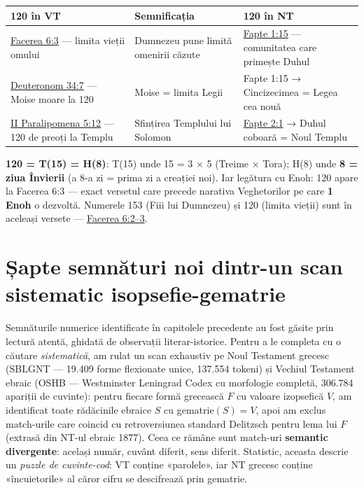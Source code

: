 \documentclass[12pt,a4paper,twoside,openany]{book}
\begin{document}
\begin{center}
\small
\begin{tabular}{L{5.4cm}L{4.3cm}L{5.2cm}}
\toprule
{}
\textbf{120 în VT} & \textbf{Semnificația} & \textbf{120 în NT} \\
\midrule
\href{https://bibliaortodoxa.ro/carte.php?id=25\&cap=6\#3}{Facerea 6:3} — limita vieții omului & Dumnezeu pune limită omenirii căzute & \href{https://bibliaortodoxa.ro/carte.php?id=26\&cap=1\#15}{Fapte 1:15} — comunitatea care primește Duhul \\
\href{https://bibliaortodoxa.ro/carte.php?id=17\&cap=34\#7}{Deuteronom 34:7} — Moise moare la 120 & Moise = limita Legii & Fapte 1:15 → Cincizecimea = Legea cea nouă \\
\href{https://bibliaortodoxa.ro/carte.php?id=15\&cap=5\#12}{II Paralipomena 5:12} — 120 de preoți la Templu & Sfințirea Templului lui Solomon & \href{https://bibliaortodoxa.ro/carte.php?id=26\&cap=2\#1}{Fapte 2:1} → Duhul coboară = Noul Templu \\
\bottomrule
\end{tabular}
\end{center}
\normalsize
\textbf{120 = T(15) = H(8)}: T(15) unde 15 = 3 × 5 (Treime × Tora); H(8) unde \textbf{8 = ziua Învierii} (a 8-a zi = prima zi a creației noi). Iar legătura cu Enoh: 120 apare la Facerea 6:3 — exact versetul care precede narativa Veghetorilor pe care \textbf{1 Enoh} o dezvoltă. Numerele 153 (Fiii lui Dumnezeu) și 120 (limita vieții) sunt în aceleași versete — \href{https://bibliaortodoxa.ro/carte.php?id=25\&cap=6\#2}{Facerea 6:2–3}.


\section{Șapte semnături noi dintr-un scan sistematic isopsefie-gematrie}
\label{sec:cipher_scan_ro}

Semnăturile numerice identificate în capitolele precedente au fost găsite prin lectură atentă, ghidată de observații literar-istorice. Pentru a le completa cu o căutare \textit{sistematică}, am rulat un scan exhaustiv pe Noul Testament grecesc (SBLGNT — 19.409 forme flexionate unice, 137.554 tokeni) și Vechiul Testament ebraic (OSHB — Westminster Leningrad Codex cu morfologie completă, 306.784 apariții de cuvinte): pentru fiecare formă grecească $F$ cu valoare izopsefică $V$, am identificat toate rădăcinile ebraice $S$ cu gematrie$(S) = V$, apoi am exclus match-urile care coincid cu retroversiunea standard Delitzsch pentru lema lui $F$ (extrasă din NT-ul ebraic 1877). Ceea ce rămâne sunt match-uri \textbf{semantic divergente}: același număr, cuvânt diferit, sens diferit. Statistic, aceasta descrie un \textit{puzzle de cuvinte-cod}: VT conține «parolele», iar NT grecesc conține «încuietorile» al căror cifru se descifrează prin gematrie.
\end{document}

